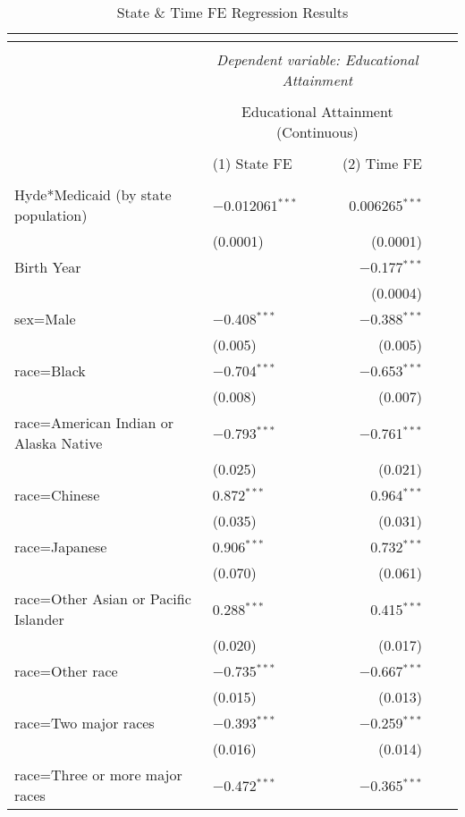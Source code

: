     \begin{longtable}{ll|rrr}
    \caption{State \& Time FE Regression Results} \\
    \label{app_state.time_reg} 
    \\ [-4ex]\hline 
    \hline \\[-4ex] 
    & \multicolumn{2}{c}{\textit{Dependent variable: Educational Attainment}} \\ 
    \cline{2-3} 
    \\[-4ex] & \multicolumn{2}{c}{Educational Attainment (Continuous)} \\ 
    \\[-4ex] & (1) State FE & (2) Time FE\\ 
    \hline \\[-4ex] 
        Hyde*Medicaid (by state population) & $-$0.012061$^{***}$ & 0.006265$^{***}$ \\ 
        & (0.0001) & (0.0001) \\ 
        Birth Year &  & $-$0.177$^{***}$ \\ 
        &  & (0.0004) \\ 
        sex=Male & $-$0.408$^{***}$ & $-$0.388$^{***}$ \\ 
        & (0.005) & (0.005) \\ 
        race=Black & $-$0.704$^{***}$ & $-$0.653$^{***}$ \\ 
        & (0.008) & (0.007) \\ 
        race=American Indian or Alaska Native & $-$0.793$^{***}$ & $-$0.761$^{***}$ \\ 
        & (0.025) & (0.021) \\ 
        race=Chinese & 0.872$^{***}$ & 0.964$^{***}$ \\ 
        & (0.035) & (0.031) \\ 
        race=Japanese & 0.906$^{***}$ & 0.732$^{***}$ \\ 
        & (0.070) & (0.061) \\ 
        race=Other Asian or Pacific Islander & 0.288$^{***}$ & 0.415$^{***}$ \\
        & (0.020) & (0.017) \\ 
        race=Other race & $-$0.735$^{***}$ & $-$0.667$^{***}$ \\ 
        & (0.015) & (0.013) \\ 
        race=Two major races & $-$0.393$^{***}$ & $-$0.259$^{***}$ \\ 
        & (0.016) & (0.014) \\ 
        race=Three or more major races & $-$0.472$^{***}$ & $-$0.365$^{***}$ \\

\end{longtable}
